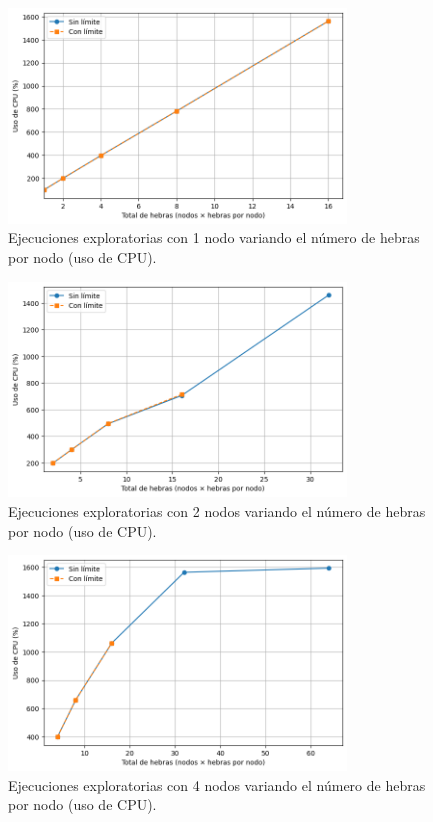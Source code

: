 \begin{figure}[ht]
    \centering
    \includegraphics[width=0.8\textwidth]{imagenes/cap5/exploratory_threads_1node_cpu.png}
    \caption{Ejecuciones exploratorias con 1 nodo variando el número de hebras por nodo (uso de CPU).}
    \label{fig:exploratory_threads_1node_cpu}
\end{figure}

\begin{figure}[ht]
    \centering
    \includegraphics[width=0.8\textwidth]{imagenes/cap5/exploratory_threads_2nodes_cpu.png}
    \caption{Ejecuciones exploratorias con 2 nodos variando el número de hebras por nodo (uso de CPU).}
    \label{fig:exploratory_threads_2nodes_cpu}
\end{figure}

\begin{figure}[ht]
    \centering
    \includegraphics[width=0.8\textwidth]{imagenes/cap5/exploratory_threads_4nodes_cpu.png}
    \caption{Ejecuciones exploratorias con 4 nodos variando el número de hebras por nodo (uso de CPU).}
    \label{fig:exploratory_threads_4nodes_cpu}
\end{figure}

